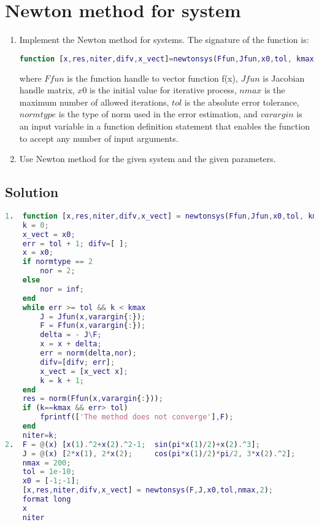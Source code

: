 \documentclass[12pt, a4paper]{report}
\begin{document}
    \newpage

    \section{Newton method for system}
        \begin{enumerate}
            \item Implement the Newton method for systems. The signature of the function is:
                \begin{lstlisting}[language=Matlab]
function [x,res,niter,difv,x_vect]=newtonsys(Ffun,Jfun,x0,tol, kmax,normtype,varargin)
                \end{lstlisting}  
                where $Ffun$ is the function handle to vector function f(x), $Jfun$ is Jacobian handle matrix, $x0$ is the initial value for iterative process, $nmax$ is the 
                maximum number of allowed iterations, $tol$ is the absolute error tolerance, $normtype$ is the type of norm used in the error estimation, and $varargin$ is an input 
                variable in a function definition statement that enables the function to accept any number of input arguments. 
            \item Use Newton method for the given system and the given parameters. 
        \end{enumerate}
    \subsection*{Solution}
        \begin{lstlisting}[language=Matlab]
1.  function [x,res,niter,difv,x_vect] = newtonsys(Ffun,Jfun,x0,tol, kmax,normtype,varargin)
    k = 0;
    x_vect = x0;
    err = tol + 1; difv=[ ];
    x = x0;
    if normtype == 2
        nor = 2;
    else
        nor = inf;
    end
    while err >= tol && k < kmax
        J = Jfun(x,varargin{:});
        F = Ffun(x,varargin{:});
        delta = - J\F;
        x = x + delta;
        err = norm(delta,nor); 
        difv=[difv; err];
        x_vect = [x_vect x];
        k = k + 1;
    end
    res = norm(Ffun(x,varargin{:}));
    if (k==kmax && err> tol)
        fprintf(['The method does not converge'],F);
    end
    niter=k;          
2.  F = @(x) [x(1).^2+x(2).^2-1;  sin(pi*x(1)/2)+x(2).^3];
    J = @(x) [2*x(1), 2*x(2);     cos(pi*x(1)/2)*pi/2, 3*x(2).^2];
    nmax = 200;
    tol = 1e-10;
    x0 = [-1;-1];
    [x,res,niter,difv,x_vect] = newtonsys(F,J,x0,tol,nmax,2);
    format long                       
    x
    niter
        \end{lstlisting}  
\end{document}
